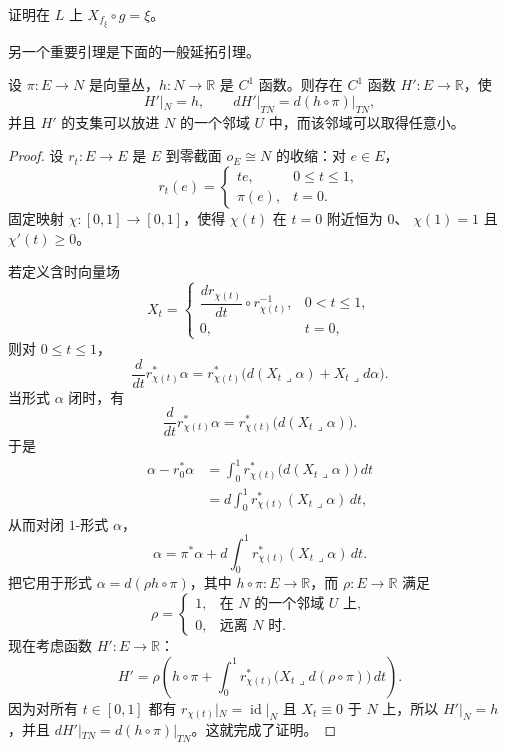 \begin{exercise}\label{ex:fiber-linear-hamiltonian}
证明在 $L$ 上 $X_{f_\xi}\circ g=\xi$。
\end{exercise}

另一个重要引理是下面的一般延拓引理。

\begin{lemma}[延拓引理]\label{lem:function-extension}
设 $\pi:E\to N$ 是向量丛，$h:N\to\mathbb R$ 是 $C^1$ 函数。则存在
$C^1$ 函数 $H':E\to\mathbb R$，使
\[
 H'|_N=h,\qquad dH'|_{TN}=d(h\circ\pi)|_{TN},
\]
并且 $H'$ 的支集可以放进 $N$ 的一个邻域 $U$ 中，而该邻域可以取得任意小。
\end{lemma}

\begin{proof}
设 $r_t:E\to E$ 是 $E$ 到零截面 $o_E\cong N$ 的收缩：对 $e\in E$，
\[
 r_t(e)=
 \begin{cases}
  te,&0\le t\le1,\\
  \pi(e),&t=0.
 \end{cases}
\]
固定映射 $\chi:[0,1]\to[0,1]$，使得 $\chi(t)$ 在 $t=0$ 附近恒为 $0$、
$\chi(1)=1$ 且 $\chi'(t)\ge0$。

若定义含时向量场
\[
 X_t=
 \begin{cases}
  \dfrac{dr_{\chi(t)}}{dt}\circ r_{\chi(t)}^{-1},&0<t\le1,\\[4pt]
  0,&t=0,
 \end{cases}
\]
则对 $0\le t\le1$，
\[
 \frac d{dt}r_{\chi(t)}^*\alpha
 =r_{\chi(t)}^*\bigl(d(X_t\mathbin{\lrcorner}\alpha)
       +X_t\mathbin{\lrcorner}d\alpha\bigr).
\]
当形式 $\alpha$ 闭时，有
\[
 \frac d{dt}r_{\chi(t)}^*\alpha
 =r_{\chi(t)}^*\bigl(d(X_t\mathbin{\lrcorner}\alpha)\bigr).
\]
于是
\[
\begin{aligned}
 \alpha-r_0^*\alpha
 &=\int_0^1r_{\chi(t)}^*\bigl(d(X_t\mathbin{\lrcorner}\alpha)\bigr)\,dt\\
 &=d\int_0^1r_{\chi(t)}^*(X_t\mathbin{\lrcorner}\alpha)\,dt,
\end{aligned}
\]
从而对闭 $1$-形式 $\alpha$，
\[
 \alpha=\pi^*\alpha+d\int_0^1
 r_{\chi(t)}^*(X_t\mathbin{\lrcorner}\alpha)\,dt.
\]
把它用于形式 $\alpha=d(\rho h\circ\pi)$，其中 $h\circ\pi:E\to\mathbb R$，而
$\rho:E\to\mathbb R$ 满足
\[
 \rho=
 \begin{cases}
  1,&\text{在 $N$ 的一个邻域 $U$ 上},\\
  0,&\text{远离 $N$ 时}.
 \end{cases}
\]
现在考虑函数 $H':E\to\mathbb R$：
\[
 H'=\rho\left(h\circ\pi+
 \int_0^1r_{\chi(t)}^*
   \bigl(X_t\mathbin{\lrcorner}d(\rho\circ\pi)\bigr)\,dt\right).
\]
因为对所有 $t\in[0,1]$ 都有
$r_{\chi(t)}|_N=\operatorname{id}|_N$ 且 $X_t\equiv0$ 于 $N$ 上，所以
$H'|_N=h$，并且 $dH'|_{TN}=d(h\circ\pi)|_{TN}$。这就完成了证明。
\end{proof}

